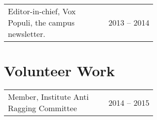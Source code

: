 \documentclass[a4paper]{article} %
\newcommand{\verticalspacing}{-0.25cm}
\newcommand{\headspace}{-0.3cm}
\newcommand{\bulletspace}{0.7cm}
\newcommand{\projectheadspacing}{6.9cm}
\newcommand{\gitproject}[3]{%
    \begin{tabular}{p{0.60\linewidth}r}
        \textcolor{NavyBlue}{\small #2} & \multicolumn{1}{m{ \projectheadspacing{} }}{\raggedleft #1}\\
    \end{tabular}\\
    \begin{tabular}{p{0.98\linewidth}}
        \vspace{\headspace{}}
        \small{#3}
    \end{tabular}
    \vspace{\verticalspacing{}}
    \vspace{-0.2cm} %
}
\newcommand{\skill}[2]{%
    \begin{tabular}{p{0.60\linewidth}r}
        \small {#2} & \multicolumn{1}{m{ \projectheadspacing{} }}{\raggedleft \textsc{\small #1}}\\
    \end{tabular}
    \vspace{\verticalspacing{}}
}
\begin{document}
\skill
    {2013 -- 2014}
    {Editor-in-chief, Vox Populi, the campus newsletter.}





\section{Volunteer Work}

\skill
    {2014 -- 2015}
    {Member, Institute Anti Ragging Committee}

\end{document}

